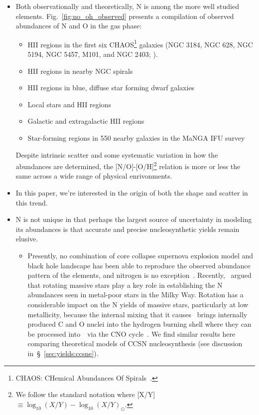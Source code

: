 \documentclass[ms.tex]{subfiles}
\begin{document}
\begin{itemize} 
	\item Both observationally and theoretically, N is among the more well 
	studied elements. 
	Fig.~\ref{fig:no_oh_observed} presents a compilation of observed abundances 
	of N and O in the gas phase: 
	\begin{itemize} 
		\item HII regions in the first six CHAOS\footnote{
			CHAOS: CHemical Abundances Of Spirals~\citep{Berg2015}.
		} galaxies (NGC 3184, NGC 628, NGC 5194, NGC 5457, M101, and NGC 2403;
		\citealp{Berg2020, Skillman2020, Rogers2021}).

		\item HII regions in nearby NGC spirals~\citep{Pilyugin2010} 

		\item HII regions in blue, diffuse star forming dwarf 
		galaxies~\citep{Berg2012, Izotov2012, James2015} 

		\item Local stars and HII regions~\citep{Dopita2016} 

		\item Galactic and extragalactic HII regions~\citep{Henry2000} 

		\item Star-forming regions in 550 nearby galaxies in the MaNGA IFU 
		survey~\citep{Belfiore2017} 
	\end{itemize} 
	Despite intrinsic scatter and some systematic variation in how the 
	abundances are determined, the [N/O]-[O/H]\footnote{
		We follow the standard notation where 
		[X/Y]~$\equiv \log_{10}(X/Y) - \log_{10}(X/Y)_\odot$. 
	} relation is more or less the same across a wide range of physical 
	enrivonments. 

	\item In this paper, we're interested in the origin of both the shape and 
	scatter in this trend. 

	\item N is not unique in that perhaps the largest source of uncertainty in 
	modeling its abundances is that accurate and precise nucleosynthetic yields 
	remain elusive. 
	\begin{itemize} 
		\item Presently, no combination of core collapse supernova explosion 
		model and black hole landscape has been able to reproduce the observed 
		abundance pattern of the elements, and nitrogen is no 
		exception~\citep{Griffith2021}. 
		Recently,~\citet*{Grisoni2021} argued that rotating massive stars play 
		a key role in establishing the N abundances seen in metal-poor stars in 
		the Milky Way. 
		Rotation has a considerable impact on the N yields of massive stars, 
		particularly at low metallicity, because the internal mixing that it 
		causes~\citep{Zahn1992, Maeder1998, Lagarde2012} brings internally 
		produced C and O nuclei into the hydrogen burning shell where they can 
		be processed into~\Nfourteen~via the CNO cycle~\citep{Heger2010, 
		Frischknecht2016, Andrews2017}. 
		We find similar results here comparing theoretical models of CCSN 
		nucleosynthesis (see discussion in~\S~\ref{sec:yields:ccsne}). 
	

\end{itemize}
\end{itemize}
\end{document}
